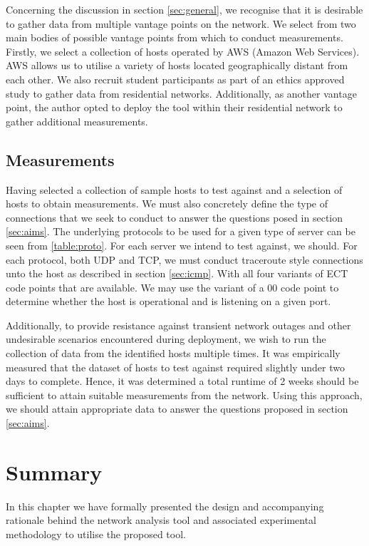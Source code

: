 \documentclass{l4proj}
\begin{document}
Concerning the discussion in section \ref{sec:general}, we recognise that it is desirable to gather data from multiple vantage points on the network. We select from two main bodies of possible vantage points from which to conduct measurements. Firstly, we select a collection of hosts operated by AWS (Amazon Web Services). AWS allows us to utilise a variety of hosts located geographically distant from each other. We also recruit student participants as part of an ethics approved study to gather data from residential networks. Additionally, as another vantage point, the author opted to deploy the tool within their residential network to gather additional measurements.

\subsection{Measurements}

Having selected a collection of sample hosts to test against and a selection of hosts to obtain measurements. We must also concretely define the type of connections that we seek to conduct to answer the questions posed in section \ref{sec:aims}. The underlying protocols to be used for a given type of server can be seen from \ref{table:proto}. For each server we intend to test against, we should. For each protocol, both UDP and TCP, we must conduct traceroute style connections unto the host as described in section \ref{sec:icmp}. With all four variants of ECT code points that are available. We may use the variant of a 00 code point to determine whether the host is operational and is listening on a given port.

Additionally, to provide resistance against transient network outages and other undesirable scenarios encountered during deployment, we wish to run the collection of data from the identified hosts multiple times. It was empirically measured that the dataset of hosts to test against required slightly under two days to complete. Hence, it was determined a total runtime of 2 weeks should be sufficient to attain suitable measurements from the network. Using this approach, we should attain appropriate data to answer the questions proposed in section \ref{sec:aims}.

\section{Summary}

In this chapter we have formally presented the design and accompanying rationale behind the network analysis tool and associated experimental methodology to utilise the proposed tool.
\end{document}
